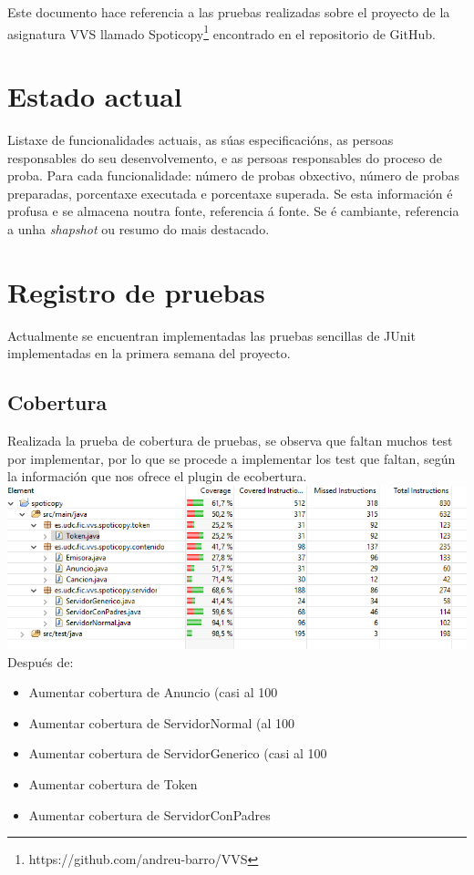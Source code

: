 \documentclass[12pt, a4paper, titlepage]{article}
\begin{document}
Este documento hace referencia a las pruebas realizadas sobre el proyecto de la asignatura VVS llamado Spoticopy\footnote{https://github.com/andreu-barro/VVS} encontrado en el repositorio de GitHub.

\section{Estado actual}

Listaxe de funcionalidades actuais, as súas especificacións, as persoas responsables do seu desenvolvemento, e as persoas responsables do proceso de proba.  Para cada funcionalidade: número de probas obxectivo, número de probas preparadas, porcentaxe executada e porcentaxe superada. Se esta información é profusa e se almacena noutra fonte, referencia á fonte. Se é cambiante, referencia a unha \emph{shapshot} ou resumo do mais destacado.

\section{Registro de pruebas}
Actualmente se encuentran implementadas las pruebas sencillas de JUnit implementadas en la primera semana del proyecto.
\subsection{Cobertura}
Realizada la prueba de cobertura de pruebas, se observa que faltan muchos test por implementar, por lo que se procede a implementar los test que faltan, según la información que nos ofrece el plugin de ecobertura.\\
\includegraphics[width=15cm]{Imagenes/CoberturaSemana1.png} \\

Después de:
\begin{itemize}
	\item Aumentar cobertura de Anuncio (casi al 100%
	\item Aumentar cobertura de ServidorNormal (al 100%
	\item Aumentar cobertura de ServidorGenerico (casi al 100%
	\item Aumentar cobertura de Token 
	\item Aumentar cobertura de ServidorConPadres
\end{itemize}
\end{document}
